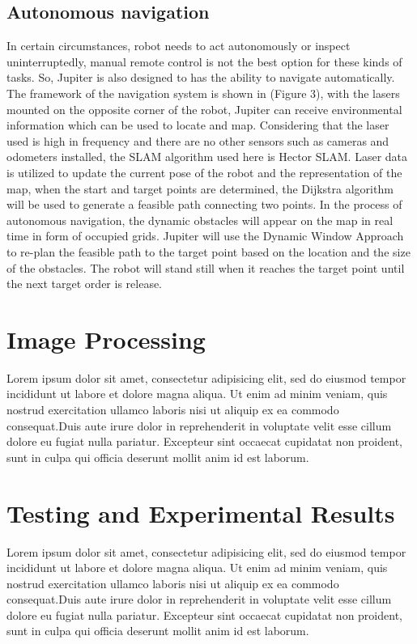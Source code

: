 \documentclass[twocolumn]{article}
\begin{document}
    \subsection{Autonomous navigation}
    In certain circumstances, robot needs to act autonomously or inspect uninterruptedly, manual remote 
    control is not the best option for these kinds of tasks. So, Jupiter is also designed to has the 
    ability to navigate automatically. The framework of the navigation system is shown in (Figure 3), 
    with the lasers mounted on the opposite corner of the robot, Jupiter can receive environmental 
    information which can be used to locate and map. Considering that the laser used is high in frequency 
    and there are no other sensors such as cameras and odometers installed, the SLAM algorithm used here 
    is Hector SLAM. Laser data is utilized to update the current pose of the robot and the representation 
    of the map, when the start and target points are determined, the Dijkstra algorithm will be used to 
    generate a feasible path connecting two points. In the process of autonomous navigation, the dynamic 
    obstacles will appear on the map in real time in form of occupied grids. Jupiter will use the Dynamic 
    Window Approach to re-plan the feasible path to the target point based on the location and the size 
    of the obstacles. The robot will stand still when it reaches the target point until the next target 
    order is release.
    
    \section{Image Processing}
        Lorem ipsum dolor sit amet, consectetur adipisicing elit, sed do eiusmod
        tempor incididunt ut labore et dolore magna aliqua. Ut enim ad minim veniam,
        quis nostrud exercitation ullamco laboris nisi ut aliquip ex ea commodo
        consequat.Duis aute irure dolor in reprehenderit in voluptate velit esse
        cillum dolore eu fugiat nulla pariatur. Excepteur sint occaecat cupidatat non
        proident, sunt in culpa qui officia deserunt mollit anim id est laborum.
     
     \section{Testing and Experimental Results}
        Lorem ipsum dolor sit amet, consectetur adipisicing elit, sed do eiusmod
        tempor incididunt ut labore et dolore magna aliqua. Ut enim ad minim veniam,
        quis nostrud exercitation ullamco laboris nisi ut aliquip ex ea commodo
        consequat.Duis aute irure dolor in reprehenderit in voluptate velit esse
        cillum dolore eu fugiat nulla pariatur. Excepteur sint occaecat cupidatat non
        proident, sunt in culpa qui officia deserunt mollit anim id est laborum.
    
    
    
\end{document}
